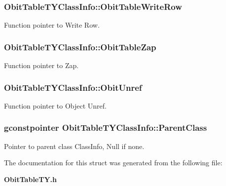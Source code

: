 \subsubsection{ {\bf Obit\-Table\-TYClass\-Info::Obit\-Table\-Write\-Row}}\label{structObitTableTYClassInfo_o26}


Function pointer to Write Row. 

\subsubsection{ {\bf Obit\-Table\-TYClass\-Info::Obit\-Table\-Zap}}\label{structObitTableTYClassInfo_o19}


Function pointer to Zap. 

\subsubsection{ {\bf Obit\-Table\-TYClass\-Info::Obit\-Unref}}\label{structObitTableTYClassInfo_o11}


Function pointer to Object Unref. 

\subsubsection{\setlength{\rightskip}{0pt plus 5cm}gconstpointer {\bf Obit\-Table\-TYClass\-Info::Parent\-Class}}\label{structObitTableTYClassInfo_o3}


Pointer to parent class Class\-Info, Null if none. 



The documentation for this struct was generated from the following file:\begin{CompactItemize}
\item 
{\bf Obit\-Table\-TY.h}\end{CompactItemize}
